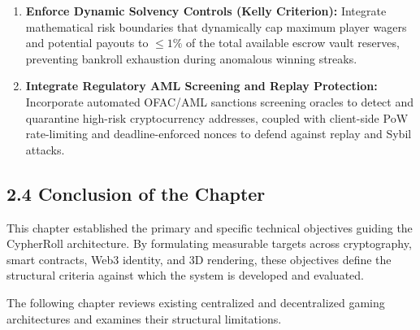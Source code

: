 \begin{enumerate}[leftmargin=*]
    \item \textbf{Enforce Dynamic Solvency Controls (Kelly Criterion):} Integrate mathematical risk boundaries that dynamically cap maximum player wagers and potential payouts to $\le 1\%$ of the total available escrow vault reserves, preventing bankroll exhaustion during anomalous winning streaks.
    
    \item \textbf{Integrate Regulatory AML Screening and Replay Protection:} Incorporate automated OFAC/AML sanctions screening oracles to detect and quarantine high-risk cryptocurrency addresses, coupled with client-side PoW rate-limiting and deadline-enforced nonces to defend against replay and Sybil attacks.
\end{enumerate}

\subsection*{2.4 Conclusion of the Chapter}
This chapter established the primary and specific technical objectives guiding the CypherRoll architecture. By formulating measurable targets across cryptography, smart contracts, Web3 identity, and 3D rendering, these objectives define the structural criteria against which the system is developed and evaluated.

The following chapter reviews existing centralized and decentralized gaming architectures and examines their structural limitations.
\label{chap:objectives_end}
